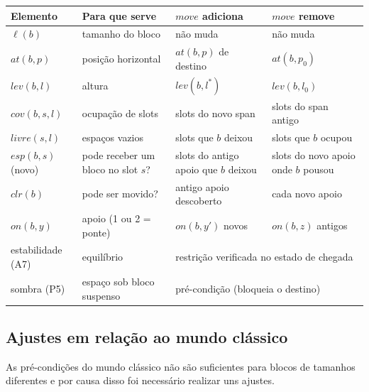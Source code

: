 \documentclass[11pt,a4paper]{article}
\newcommand{\clr}{\mathit{clr}}
\newcommand{\at}{\mathit{at}}
\newcommand{\lev}{\mathit{lev}}
\newcommand{\cov}{\mathit{cov}}
\newcommand{\livre}{\mathit{livre}}
\newcommand{\esp}{\mathit{esp}}
\newcommand{\on}{\mathit{on}}
\newcommand{\mv}{\mathit{move}}
\begin{document}
\begin{center}\small
\begin{tabularx}{\textwidth}{@{}l X X X@{}}
\toprule
Elemento & Para que serve & $\mv$ adiciona & $\mv$ remove\\
\midrule
$\ell(b)$ & tamanho do bloco & não muda & não muda\\
$\at(b,p)$ & posição horizontal & $\at(b,p)$ de destino & $\at(b,p_0)$\\
$\lev(b,l)$ & altura & $\lev(b,l^\ast)$ & $\lev(b,l_0)$\\
$\cov(b,s,l)$ & ocupação de slots & slots do novo span & slots do span antigo\\
$\livre(s,l)$ & espaços vazios & slots que $b$ deixou & slots que $b$ ocupou\\
$\esp(b,s)$ (novo) & pode receber um bloco no slot $s$? & slots do antigo apoio que $b$ deixou &
  slots do novo apoio onde $b$ pousou\\
$\clr(b)$ & pode ser movido? & antigo apoio descoberto & cada novo apoio\\
$\on(b,y)$ & apoio (1 ou 2 = ponte) & $\on(b,y')$ novos & $\on(b,z)$ antigos\\
estabilidade (A7) & equilíbrio & \multicolumn{2}{l}{restrição verificada no estado de chegada}\\
sombra (P5) & espaço sob bloco suspenso & \multicolumn{2}{l}{pré-condição (bloqueia o destino)}\\
\bottomrule
\end{tabularx}
\end{center}

\subsection{Ajustes em relação ao mundo clássico}
\label{sec:ajustes}
As pré-condições do mundo clássico não são suficientes para blocos de tamanhos
diferentes e por causa disso foi necessário realizar uns ajustes.
\end{document}

